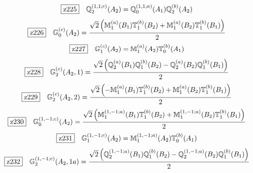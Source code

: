 \documentclass[fleqn,10pt,landscape]{jsarticle}
\begin{document}
\begin{dmath*}
\hspace*{3mm}\fbox{z225}\quad \mathbb{Q}_{2}^{(1,1;c)}(A_{2})=\mathbb{Q}_{0}^{(1,1;a)}(A_{1}) \mathbb{Q}_{2}^{(b)}(A_{2})
\end{dmath*}
\begin{dmath*}
\hspace*{3mm}\fbox{z226}\quad \mathbb{G}_{0}^{(c)}(A_{2})=\frac{\sqrt{2} \left(\mathbb{M}_{1}^{(a)}(B_{1}) \mathbb{T}_{1}^{(b)}(B_{2}) + \mathbb{M}_{1}^{(a)}(B_{2}) \mathbb{T}_{1}^{(b)}(B_{1})\right)}{2}
\end{dmath*}
\begin{dmath*}
\hspace*{3mm}\fbox{z227}\quad \mathbb{G}_{1}^{(c)}(A_{2})=\mathbb{M}_{1}^{(a)}(A_{2}) \mathbb{T}_{0}^{(b)}(A_{1})
\end{dmath*}
\begin{dmath*}
\hspace*{3mm}\fbox{z228}\quad \mathbb{G}_{2}^{(c)}(A_{2},1)=\frac{\sqrt{2} \left(\mathbb{Q}_{2}^{(a)}(B_{1}) \mathbb{Q}_{1}^{(b)}(B_{2}) - \mathbb{Q}_{2}^{(a)}(B_{2}) \mathbb{Q}_{1}^{(b)}(B_{1})\right)}{2}
\end{dmath*}
\begin{dmath*}
\hspace*{3mm}\fbox{z229}\quad \mathbb{G}_{2}^{(c)}(A_{2},2)=\frac{\sqrt{2} \left(- \mathbb{M}_{1}^{(a)}(B_{1}) \mathbb{T}_{1}^{(b)}(B_{2}) + \mathbb{M}_{1}^{(a)}(B_{2}) \mathbb{T}_{1}^{(b)}(B_{1})\right)}{2}
\end{dmath*}
\begin{dmath*}
\hspace*{3mm}\fbox{z230}\quad \mathbb{G}_{0}^{(1,-1;c)}(A_{2})=\frac{\sqrt{2} \left(\mathbb{M}_{1}^{(1,-1;a)}(B_{1}) \mathbb{T}_{1}^{(b)}(B_{2}) + \mathbb{M}_{1}^{(1,-1;a)}(B_{2}) \mathbb{T}_{1}^{(b)}(B_{1})\right)}{2}
\end{dmath*}
\begin{dmath*}
\hspace*{3mm}\fbox{z231}\quad \mathbb{G}_{1}^{(1,-1;c)}(A_{2})=\mathbb{M}_{1}^{(1,-1;a)}(A_{2}) \mathbb{T}_{0}^{(b)}(A_{1})
\end{dmath*}
\begin{dmath*}
\hspace*{3mm}\fbox{z232}\quad \mathbb{G}_{2}^{(1,-1;c)}(A_{2},1a)=\frac{\sqrt{2} \left(\mathbb{Q}_{2}^{(1,-1;a)}(B_{1}) \mathbb{Q}_{1}^{(b)}(B_{2}) - \mathbb{Q}_{2}^{(1,-1;a)}(B_{2}) \mathbb{Q}_{1}^{(b)}(B_{1})\right)}{2}
\end{dmath*}
\end{document}
